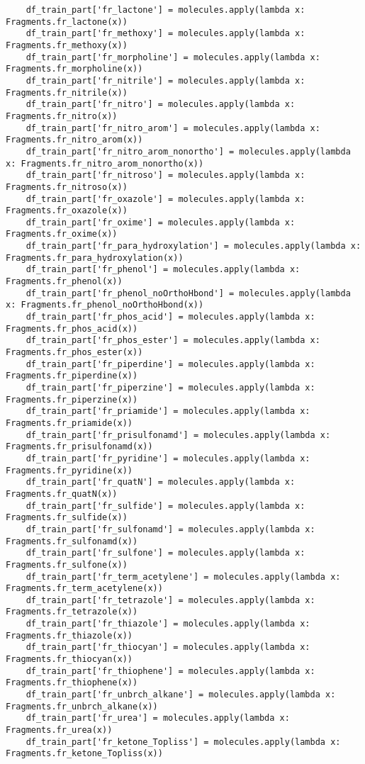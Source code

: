 \documentclass[11pt, oneside]{article}   	%
\begin{document}
\begin{lstlisting}
    df_train_part['fr_lactone'] = molecules.apply(lambda x: Fragments.fr_lactone(x))
    df_train_part['fr_methoxy'] = molecules.apply(lambda x: Fragments.fr_methoxy(x))
    df_train_part['fr_morpholine'] = molecules.apply(lambda x: Fragments.fr_morpholine(x))
    df_train_part['fr_nitrile'] = molecules.apply(lambda x: Fragments.fr_nitrile(x))
    df_train_part['fr_nitro'] = molecules.apply(lambda x: Fragments.fr_nitro(x))
    df_train_part['fr_nitro_arom'] = molecules.apply(lambda x: Fragments.fr_nitro_arom(x))
    df_train_part['fr_nitro_arom_nonortho'] = molecules.apply(lambda x: Fragments.fr_nitro_arom_nonortho(x))
    df_train_part['fr_nitroso'] = molecules.apply(lambda x: Fragments.fr_nitroso(x))
    df_train_part['fr_oxazole'] = molecules.apply(lambda x: Fragments.fr_oxazole(x))
    df_train_part['fr_oxime'] = molecules.apply(lambda x: Fragments.fr_oxime(x))
    df_train_part['fr_para_hydroxylation'] = molecules.apply(lambda x: Fragments.fr_para_hydroxylation(x))
    df_train_part['fr_phenol'] = molecules.apply(lambda x: Fragments.fr_phenol(x))
    df_train_part['fr_phenol_noOrthoHbond'] = molecules.apply(lambda x: Fragments.fr_phenol_noOrthoHbond(x))
    df_train_part['fr_phos_acid'] = molecules.apply(lambda x: Fragments.fr_phos_acid(x))
    df_train_part['fr_phos_ester'] = molecules.apply(lambda x: Fragments.fr_phos_ester(x))
    df_train_part['fr_piperdine'] = molecules.apply(lambda x: Fragments.fr_piperdine(x))
    df_train_part['fr_piperzine'] = molecules.apply(lambda x: Fragments.fr_piperzine(x))
    df_train_part['fr_priamide'] = molecules.apply(lambda x: Fragments.fr_priamide(x))
    df_train_part['fr_prisulfonamd'] = molecules.apply(lambda x: Fragments.fr_prisulfonamd(x))
    df_train_part['fr_pyridine'] = molecules.apply(lambda x: Fragments.fr_pyridine(x))
    df_train_part['fr_quatN'] = molecules.apply(lambda x: Fragments.fr_quatN(x))
    df_train_part['fr_sulfide'] = molecules.apply(lambda x: Fragments.fr_sulfide(x))
    df_train_part['fr_sulfonamd'] = molecules.apply(lambda x: Fragments.fr_sulfonamd(x))
    df_train_part['fr_sulfone'] = molecules.apply(lambda x: Fragments.fr_sulfone(x))
    df_train_part['fr_term_acetylene'] = molecules.apply(lambda x: Fragments.fr_term_acetylene(x))
    df_train_part['fr_tetrazole'] = molecules.apply(lambda x: Fragments.fr_tetrazole(x))
    df_train_part['fr_thiazole'] = molecules.apply(lambda x: Fragments.fr_thiazole(x))
    df_train_part['fr_thiocyan'] = molecules.apply(lambda x: Fragments.fr_thiocyan(x))
    df_train_part['fr_thiophene'] = molecules.apply(lambda x: Fragments.fr_thiophene(x))
    df_train_part['fr_unbrch_alkane'] = molecules.apply(lambda x: Fragments.fr_unbrch_alkane(x))
    df_train_part['fr_urea'] = molecules.apply(lambda x: Fragments.fr_urea(x))
    df_train_part['fr_ketone_Topliss'] = molecules.apply(lambda x: Fragments.fr_ketone_Topliss(x))
    

\end{lstlisting}
\end{document}
